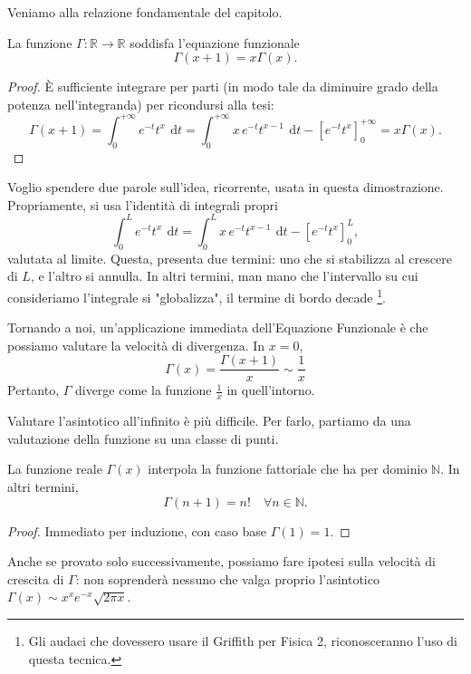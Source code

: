 Veniamo alla relazione fondamentale del capitolo. 
\begin{Res}
La funzione $ \Gamma: \mathbb{R} \to \mathbb{R}$ soddisfa l'equazione funzionale
	\begin{equation*}
		\Gamma(x+1)=
		x \Gamma(x).
	\end{equation*}
\end{Res}
\begin{proof}
È sufficiente integrare per parti (in modo tale da diminuire grado della potenza nell'integranda) per ricondursi alla tesi:
	\begin{equation*}
		\Gamma(x+1)= \int^{+ \infty}_0 e^{-t}t^x \: \, \mathrm{d}t =
		\int^{+ \infty}_0 x \, e^{-t}t^{x-1} \: \, \mathrm{d}t - \left[e^{-t}t^x \right]^{+ \infty}_0 =
		x \Gamma(x).
	\end{equation*}
\end{proof}
Voglio spendere due parole sull'idea, ricorrente, usata in questa dimostrazione. 
Propriamente, si usa l'identità di integrali propri
\begin{equation*}
	\int^L_0 e^{-t} t^x \: \, \mathrm{d}t = 
	\int^L_0 x \, e^{-t} t^{x-1} \: \, \mathrm{d}t - \left[e^{-t} t^x \right]^L_0,
\end{equation*}
valutata al limite. 
Questa, presenta due termini: uno che si stabilizza al crescere di $L$, e l'altro si annulla. 
In altri termini, man mano che l'intervallo su cui consideriamo l'integrale si "globalizza", il termine di bordo decade \footnote{Gli audaci che dovessero usare il Griffith per Fisica 2, riconosceranno l'uso di questa tecnica.}.

Tornando a noi, un'applicazione immediata dell'Equazione Funzionale è che possiamo valutare la velocità di divergenza.
In $x=0$,
\begin{equation*}
	\Gamma(x)= \frac{ \Gamma(x+1)}{x} \sim \frac{1}{x}
\end{equation*}
Pertanto, $ \Gamma$ diverge come la funzione $ \frac{1}{x}$ in quell'intorno. 

Valutare l'asintotico all'infinito è più difficile. 
Per farlo, partiamo da una valutazione della funzione su una classe di punti.

\begin{Res} 
La funzione reale $ \Gamma(x)$ interpola la funzione fattoriale che ha per dominio $ \mathbb{N}$. 
In altri termini,
	\begin{equation*}
		\Gamma(n+1)=n! \quad \forall n \in \mathbb{N}.
	\end{equation*}
\end{Res}
\begin{proof}
Immediato per induzione, con caso base $ \Gamma(1)=1$.
\end{proof}
Anche se provato solo successivamente, possiamo fare ipotesi sulla velocità di crescita di $ \Gamma$: non soprenderà nessuno che valga proprio l'asintotico $ \Gamma(x) \sim x^x e^{-x} \sqrt{2 \pi x}$.


